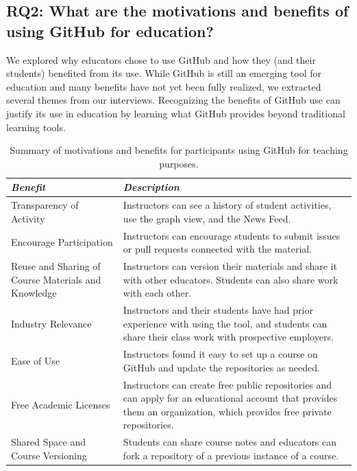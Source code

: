 \subsection{RQ2: What are the motivations and benefits of using GitHub for education?}

We explored why educators chose to use GitHub and how they (and their students) benefited from its use. While GitHub is still an emerging tool for education and many benefits have not yet been fully realized, we extracted several themes from our interviews. Recognizing the benefits of GitHub use can justify its use in education by learning what GitHub provides beyond traditional learning tools.

\begin{table}[h]
    \vspace{1pt}
        \caption{Summary of motivations and benefits for participants using GitHub for teaching purposes.}\label{table:interviews:benefits}
    \vspace{1pt}
    \begin{center}
        \begin{tabular}{ | m{3cm} | m{12cm} | }
            \hline
            \emph{Benefit} & \emph{Description} \\
            \hline
            Transparency of Activity & Instructors can see a history of student activities, use the graph view, and the News Feed. \\
            \hline
            Encourage Participation & Instructors can encourage students to submit issues or pull requests connected with the material. \\
            \hline
            Reuse and Sharing of Course Materials and Knowledge & Instructors can version their materials and share it with other educators. Students can also share work with each other. \\
            \hline
            Industry Relevance & Instructors and their students have had prior experience with using the tool, and students can share their class work with prospective employers. \\
            \hline
            Ease of Use & Instructors found it easy to set up a course on GitHub and update the repositories as needed. \\
            \hline
            Free Academic Licenses & Instructors can create free public repositories and can apply for an educational account that provides them an organization, which provides free private repositories. \\
            \hline
            Shared Space and Course Versioning & Students can share course notes and educators can fork a repository of a previous instance of a course. \\
        \hline
        \end{tabular}
    \end{center}
\end{table}

